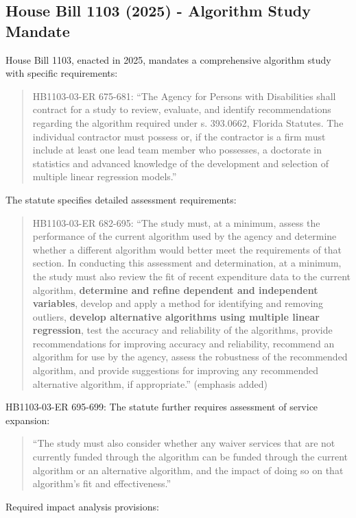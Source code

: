 \subsection{House Bill 1103 (2025) - Algorithm Study Mandate}

House Bill 1103, enacted in 2025, mandates a comprehensive algorithm study with specific requirements:

\begin{quote}
HB1103-03-ER 675-681: ``The Agency for Persons with Disabilities shall contract for a study to review, evaluate, and identify recommendations regarding the algorithm required under s. 393.0662, Florida Statutes. The individual contractor must possess or, if the contractor is a firm must include at least one lead team member who possesses, a doctorate in statistics and advanced knowledge of the development and selection of multiple linear regression models.''
\end{quote}
%
The statute specifies detailed assessment requirements:
%
\begin{quote}
HB1103-03-ER 682-695:  ``The study must, at a minimum, assess the performance of the current algorithm used by the agency and determine whether a different algorithm would better meet the requirements of that section. In conducting this assessment and determination, at a minimum, the study must also review the fit of recent expenditure data to the current algorithm, \textbf{determine and refine dependent and independent variables}, develop and apply a method for identifying and removing outliers, \textbf{develop alternative algorithms using multiple linear regression}, test the accuracy and reliability of the algorithms, provide recommendations for improving accuracy and reliability, recommend an algorithm for use by the agency, assess the robustness of the recommended algorithm, and provide suggestions for improving any recommended alternative algorithm, if appropriate.'' (emphasis added)
\end{quote} 
%
HB1103-03-ER 695-699: The statute further requires assessment of service expansion:
%
\begin{quote}
``The study must also consider whether any waiver services that are not currently funded through the algorithm can be funded through the current algorithm or an alternative algorithm, and the impact of doing so on that algorithm's fit and effectiveness.''
\end{quote}
%
Required impact analysis provisions:
